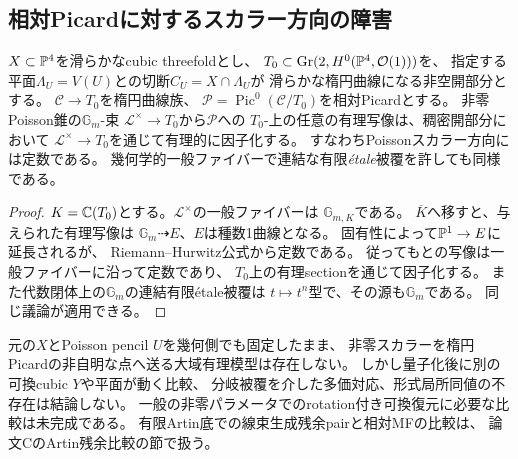 \subsection{相対Picardに対するスカラー方向の障害}
\begin{proposition}\label{prop:relative-scalar-picard}
$X\subset\mathbb P^4$を滑らかなcubic threefoldとし、
$T_0\subset\operatorname{Gr}(2,H^0(\mathbb P^4,\mathcal O(1)))$を、
指定する平面$\Lambda_U=V(U)$との切断$C_U=X\cap\Lambda_U$が
滑らかな楕円曲線になる非空開部分とする。
$\mathscr C\to T_0$を楕円曲線族、
$\mathscr P=\operatorname{Pic}^0(\mathscr C/T_0)$を相対Picardとする。
非零Poisson錐の$\mathbb G_m$-束
$\mathscr L^\times\to T_0$から$\mathscr P$への
$T_0$-上の任意の有理写像は、稠密開部分において
$\mathscr L^\times\to T_0$を通じて有理的に因子化する。
すなわちPoissonスカラー方向には定数である。
幾何学的一般ファイバーで連結な有限\emph{étale}被覆を許しても同様である。
\end{proposition}
\begin{proof}
$K=\mathbb C(T_0)$とする。$\mathscr L^\times$の一般ファイバーは
$\mathbb G_{m,K}$である。
$\overline K$へ移すと、与えられた有理写像は
$\mathbb G_m\dashrightarrow E$、$E$は種数1曲線となる。
固有性によって$\mathbb P^1\to E$に延長されるが、
Riemann--Hurwitz公式から定数である。
従ってもとの写像は一般ファイバーに沿って定数であり、
$T_0$上の有理sectionを通じて因子化する。
また代数閉体上の$\mathbb G_m$の連結有限étale被覆は
$t\mapsto t^n$型で、その源も$\mathbb G_m$である。
同じ議論が適用できる。
\end{proof}
\begin{remark}[復元への含意と限界]
元の$X$とPoisson pencil $U$を幾何側でも固定したまま、
非零スカラーを楕円Picardの非自明な点へ送る大域有理模型は存在しない。
しかし量子化後に別の可換cubic $Y$や平面が動く比較、
分岐被覆を介した多価対応、形式局所同値の不存在は結論しない。
一般の非零パラメータでのrotation付き可換復元に必要な比較は未完成である。
有限Artin底での線束生成残余pairと相対MFの比較は、
論文CのArtin残余比較の節で扱う。
\end{remark}
